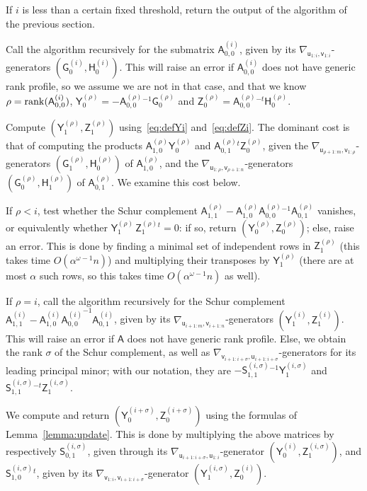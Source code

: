 \documentclass{sig-alternate}
\newcommand{\vu}{\ensuremath{\mathsf{u}}}
\newcommand{\vv}{\ensuremath{\mathsf{v}}}
\newcommand{\mA}{\ensuremath{\mathsf{A}}}
\newcommand{\mG}{\ensuremath{\mathsf{G}}}
\newcommand{\mH}{\ensuremath{\mathsf{H}}}
\newcommand{\mS}{\ensuremath{\mathsf{S}}}
\newcommand{\mY}{\ensuremath{\mathsf{Y}}}
\newcommand{\mZ}{\ensuremath{\mathsf{Z}}}
\begin{document}
\smallskip{} If $i$ is less than a certain fixed threshold, return the
output of the algorithm of the previous section.

\smallskip{} Call the algorithm recursively for the
submatrix ${\mA^{(i)}_{0,0}}$, given by its
$\nabla_{\vu_{1:i},\vv_{1:i}}$-generators
$(\mG^{(i)}_0,\mH^{(i)}_0)$. This will raise an error if
${\mA^{(i)}_{0,0}}$ does not have generic rank profile, so we assume
we are not in that case, and that we know $\rho={\rm
  rank}({\mA^{(i)}_{0,0}})$, $\mY^{(\rho)}_0=-\mA^{(\rho)}_{0,0}{}^{-1}
\mG^{(\rho)}_0$ and $\mZ^{(\rho)}_0=\mA^{(\rho)}_{0,0}{}^{-t}\mH^{(\rho)}_0$.

\smallskip{} Compute $(\mY^{(\rho)}_1,\mZ^{(\rho)}_1)$
using~\eqref{eq:defYi} and~\eqref{eq:defZi}. The dominant cost is that
of computing the products $\mA^{(\rho)}_{1,0} \mY^{(\rho)}_0$ and
$\mA^{(\rho)}_{0,1}{}^t \mZ^{(\rho)}_0$, given the
$\nabla_{\vu_{\rho+1:m},\vv_{1:\rho}}$-generators
$(\mG^{(\rho)}_1,\mH^{(\rho)}_0)$ of $\mA^{(\rho)}_{1,0}$, and the
$\nabla_{\vu_{1:\rho},\vv_{\rho+1:n}}$-generators
$(\mG^{(\rho)}_0,\mH^{(\rho)}_1)$ of $\mA^{(\rho)}_{0,1}$.  We examine this cost
below.

\smallskip{} If $\rho < i$, test whether the Schur
complement $ \mA^{(\rho)}_{1,1} - \mA^{(\rho)}_{1,0} \mA^{(\rho)}_{0,0}{}^{-1} \mA^{(\rho)}_{0,1}$ vanishes, or
equivalently whether $\mY^{(\rho)}_1\,
\mZ^{(\rho)}_1{}^t = 0$: if so, return $(\mY^{(\rho)}_0,\mZ^{(\rho)}_0)$; else,
raise an error. This is done by finding a minimal set of
independent rows in $\mZ^{(\rho)}_1$ (this takes time $O(\alpha^{\omega-1}
n)$) and multiplying their transposes  by ${\mY^{(\rho)}_1}$ (there are at most
$\alpha$ such rows, so this takes time $O(\alpha^{\omega-1} n)$ as
well).

\smallskip{} If $\rho=i$, call the algorithm
recursively for the Schur complement $\mA^{(i)}_{1,1} -
\mA^{(i)}_{1,0} {\mA^{(i)}_{0,0}}^{-1} \mA^{(i)}_{0,1}$, given by its
$\nabla_{\vu_{i+1:m},\vv_{i+1:n}}$-generators
$(\mY^{(i)}_1,\mZ^{(i)}_1)$. This will raise an error if $\mA$ does
not have generic rank profile. Else, we obtain the rank $\sigma$ of the
Schur complement, as well as
$\nabla_{\vv_{i+1:i+\sigma},\vu_{i+1:i+\sigma}}$-generators for its
leading principal minor; with our notation, they are
$-\mS^{(i,\sigma)}_{1,1}{}^{-1} \mY^{(i,\sigma)}_1$ and
$\mS^{(i,\sigma)}_{1,1}{}^{-t} \mZ^{(i,\sigma)}_1$.  

\smallskip{}  We compute and return
$(\mY^{(i+\sigma)}_0,\mZ^{(i+\sigma)}_0)$ using the formulas of
Lemma~\ref{lemma:update}.  This is done by multiplying the above
matrices by respectively $\mS^{(i,\sigma)}_{0,1}$, given through its
$\nabla_{\vu_{i+1:i+\sigma},\vu_{1:i}}$-generator
$(\mY^{(i)}_0,\mZ^{(i,\sigma)}_{1})$, and
$\mS^{(i,\sigma)}_{1,0}{}^t$, given by its
$\nabla_{\vv_{1:i},\vv_{i+1:i+\sigma}}$-genera\-tor
$(\mY^{(i,\sigma)}_1,\mZ^{(i)}_0)$.
\end{document}
